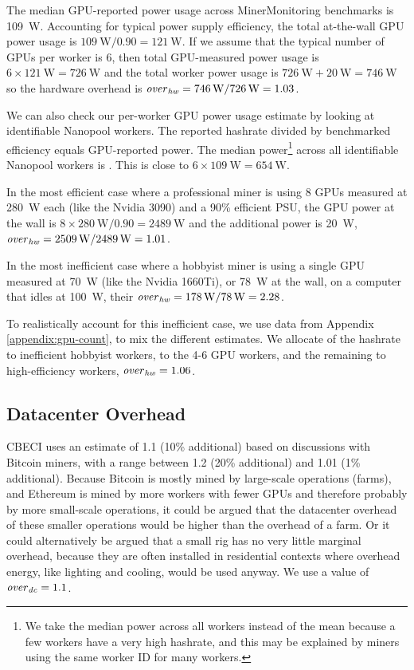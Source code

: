 The median GPU-reported power usage across MinerMonitoring benchmarks is \SI{109}{\watt}. Accounting for typical power supply efficiency, the total at-the-wall GPU power usage is $\SI{109}{\watt} / 0.90 = \SI{121}{\watt}$. If we assume that the typical number of GPUs per worker is 6, then total GPU-measured power usage is $6 \times \SI{121}{\watt} = \SI{726}{\watt}$ and the total worker power usage is $\SI{726}{\watt} + \SI{20}{\watt} = \SI{746}{\watt}$ so the hardware overhead is $\mathit{over}_\mathit{hw} = \SI{746}{\watt} / \SI{726}{\watt} = 1.03$.

We can also check our per-worker GPU power usage estimate by looking at identifiable Nanopool workers. The reported hashrate divided by benchmarked efficiency equals GPU-reported power. The median power\footnote{We take the median power across all workers instead of the mean because a few workers have a very high hashrate\cite{nanopool_0xd70d_nodate}, and this may be explained\cite{majestyle1_last_2021} by miners using the same worker ID for many workers.} across all identifiable Nanopool workers is . This is close to $6 \times \SI{109}{\watt} = \SI{654}{\watt}$.

In the most efficient case where a professional miner is using 8 GPUs measured at \SI{280}{\watt} each (like the Nvidia 3090) and a 90\% efficient PSU, the GPU power at the wall is $8 \times \SI{280}{\watt} / 0.90 = \SI{2489}{\watt}$ and the additional power is \SI{20}{\watt}, $\mathit{over}_\mathit{hw} = \SI{2509}{\watt} / \SI{2489}{\watt} = 1.01$.

In the most inefficient case where a hobbyist miner is using a single GPU measured at \SI{70}{\watt} (like the Nvidia 1660Ti), or \SI{78}{\watt} at the wall, on a computer that idles at \SI{100}{\watt}, their $\mathit{over}_\mathit{hw} = \SI{178}{\watt} / \SI{78}{\watt} = 2.28$.

To realistically account for this inefficient case, we use data from Appendix \ref{appendix:gpu-count}, to mix the different estimates. We allocate  of the hashrate to inefficient hobbyist workers,  to the 4-6 GPU workers, and the remaining  to high-efficiency workers, $\mathit{over}_\mathit{hw} = 1.06$.

\subsection{Datacenter Overhead}

CBECI uses an estimate of 1.1 (10\% additional) based on discussions with Bitcoin miners, with a range between 1.2 (20\% additional) and 1.01 (1\% additional). Because Bitcoin is mostly mined by large-scale operations (farms), and Ethereum is mined by more workers with fewer GPUs and therefore probably by more small-scale operations, it could be argued that the datacenter overhead of these smaller operations would be higher than the overhead of a farm. Or it could alternatively be argued that a small rig has no very little marginal overhead, because they are often installed in residential contexts where overhead energy, like lighting and cooling, would be used anyway. We use a value of $\mathit{over}_\mathit{dc}=1.1$.

